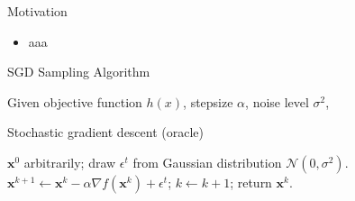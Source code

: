 \documentclass[final]{beamer}
\newlength{\sepwid}
\newlength{\onecolwid}
\newcommand{\bx}{\mathbf{x}}
\newcommand{\N}{\mathscr{N}}
\begin{document}
\begin{frame}[t]
\begin{columns}[t]
\begin{column}{\onecolwid}
\begin{block}{Motivation}
\begin{itemize}
    \item aaa
\end{itemize}

\end{block}

%

\begin{block}{SGD Sampling Algorithm}

\begin{algorithm}[H]
{\small
Given objective function $h(x)$, stepsize $\alpha$, noise level $\sigma^2$,
\begin{algorithmic}\caption{Stochastic gradient descent (oracle)}\label{Alg:SGD}
 $ \bx^0$ arbitrarily;
\STATE draw $\epsilon^t$ from Gaussian distribution $\N(0, \sigma^2)$.
\STATE
$\bx^{k+1} \gets \bx^k - \alpha\nabla f(\bx^k) + \epsilon^t$;
\STATE $k\gets k+1$;
\ENDWHILE
\STATE return $\bx^k$.
\end{algorithmic}}
\end{algorithm}


\end{block}



\end{column} %

\begin{column}{\sepwid}\end{column} %

\begin{column}{\onecolwid} %



\end{column}
\end{columns}
\end{frame}
\end{document}
